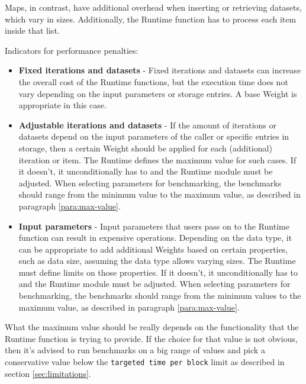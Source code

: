 \documentclass[11pt,a4paper]{article}
\begin{document}
Maps, in contrast, have additional overhead when inserting or retrieving
datasets, which vary in sizes. Additionally, the Runtime function has to process each item inside
that list.
\newline

Indicators for performance penalties:

\begin{itemize}
  \item \textbf{Fixed iterations and datasets} -
  Fixed iterations and datasets can increase the overall cost of the Runtime functions,
  but the execution time
  does not vary depending on the input parameters or storage entries.
  A base Weight is appropriate in this case.
  \item \textbf{Adjustable iterations and datasets} -
  If the amount of iterations or datasets depend on the input parameters of the caller or
  specific entries in storage,
  then a certain Weight should be applied for each (additional) iteration or item.
  The Runtime defines the maximum value for such cases. If it doesn't, it unconditionally has to
  and the Runtime module must be adjusted.
  \newline\newline
  When selecting parameters
  for benchmarking, the benchmarks should range from the minimum value to the maximum value, as described
  in paragraph \ref{para:max-value}.
  \item \textbf{Input parameters} -
  Input parameters that users pass on to the Runtime function can result in expensive operations.
  Depending on the data type, it can be appropriate to add additional Weights based on certain properties,
  such as data size, assuming the data type allows varying sizes.
  The Runtime must define limits on those properties. If it doesn't, it unconditionally
  has to and the Runtime module must be adjusted.
  \newline\newline
  When selecting parameters for benchmarking, the benchmarks should range from the minimum values to the
  maximum value, as described in paragraph \ref{para:max-value}.
\end{itemize}

\label{para:max-value} What the maximum value should be really depends on the functionality that the Runtime function
is trying to provide. If the choice for that value is not obvious, then it's advised to run
benchmarks on a big range of values and pick a conservative value below the \verb|targeted time per block|
limit as described in section \ref{sec:limitations}.
\end{document}
